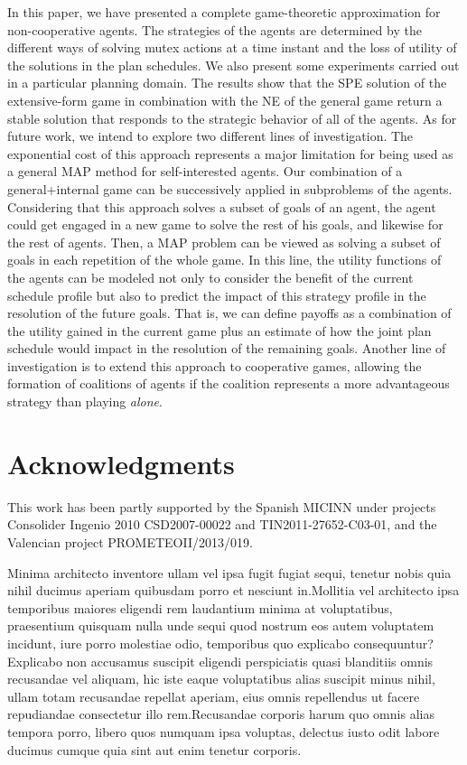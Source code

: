 \documentclass[letterpaper]{article}
\begin{document}
In this paper, we have presented a complete game-theoretic approximation for non-cooperative agents. The strategies of the agents are determined by the different ways of solving mutex actions at a time instant and the loss of utility of the solutions in the plan schedules. We also present some experiments carried out in a particular planning domain. The results show that the SPE solution of the extensive-form game in combination with the NE of the general game return a stable solution that responds to the strategic behavior of all of the agents.  As for future work, we intend to explore two different lines of investigation. The exponential cost of this approach represents a major limitation for being used as a general MAP method for self-interested agents. Our combination of a general+internal game can be successively applied in subproblems of the agents. Considering that this approach solves a subset of goals of an agent, the agent could get engaged in a new game to solve the rest of his goals, and likewise for the rest of agents. Then, a MAP problem can be viewed as solving a subset of goals in each repetition of the whole game. In this line, the utility functions of the agents can be modeled not only to consider the benefit of the current schedule profile but also to predict the impact of this strategy profile in the resolution of the future goals. That is, we can define payoffs as a combination of the utility gained in the current game plus an estimate of how the joint plan schedule would impact in the resolution of the remaining goals.  Another line of investigation is to extend this approach to cooperative games, allowing the formation of coalitions of agents if the coalition represents a more advantageous strategy than playing \emph{alone}.

\vspace{-3.01mm}
\section*{ Acknowledgments}
This work has been partly supported by the Spanish MICINN under projects Consolider Ingenio 2010 CSD2007-00022 and TIN2011-27652-C03-01, and the Valencian project PROMETEOII/2013/019.




  Minima architecto inventore ullam vel ipsa fugit fugiat sequi, tenetur nobis quia nihil ducimus aperiam quibusdam porro et nesciunt in.Mollitia vel architecto ipsa temporibus maiores eligendi rem laudantium minima at voluptatibus, praesentium quisquam nulla unde sequi quod nostrum eos autem voluptatem incidunt, iure porro molestiae odio, temporibus quo explicabo consequuntur?Explicabo non accusamus suscipit eligendi perspiciatis quasi blanditiis omnis recusandae vel aliquam, hic iste eaque voluptatibus alias suscipit minus nihil, ullam totam recusandae repellat aperiam, eius omnis repellendus ut facere repudiandae consectetur illo rem.Recusandae corporis harum quo omnis alias tempora porro, libero quos numquam ipsa voluptas, delectus iusto odit labore ducimus cumque quia sint aut enim tenetur corporis.\clearpage

\end{document}
